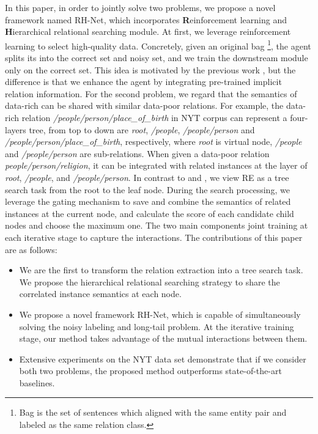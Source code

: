 \documentclass{article}
\begin{document}
In this paper, in order to jointly solve two problems, we propose a novel framework named RH-Net, which incorporates \textbf{R}einforcement learning and \textbf{H}ierarchical relational searching module. At first, we leverage reinforcement learning to select high-quality data. Concretely, given an original bag \footnote{Bag is the set of sentences which aligned with the same entity pair and labeled as the same relation class.}, the agent splits its into the correct set and noisy set, and we train the downstream module only on the correct set. This idea is motivated by the previous work \cite{Feng2018Reinforcement}, but the difference is that we enhance the agent by integrating pre-trained implicit relation information. For the second problem, we regard that the semantics of data-rich can be shared with similar data-poor relations. For example, the data-rich relation  \emph{/people/person/place\_of\_birth} in NYT corpus can represent a four-layers tree, from top to down are \emph{root}, \emph{/people}, \emph{/people/person} and \emph{/people/person/place\_of\_birth}, respectively, where \emph{root} is virtual node, \emph{/people} and \emph{/people/person} are sub-relations. When given a data-poor relation \emph{people/person/religion}, it can be integrated with related instances at the layer of \emph{root}, \emph{/people}, and \emph{/people/person}. In contrast to \cite{han2018hierarchical} and \cite{zhang2019long-tail}, we view RE as a tree search task from the root to the leaf node. During the search processing, we leverage the gating mechanism to save and combine the semantics of related instances at the current node, and calculate the score of each candidate child nodes and choose the maximum one. The two main components joint training at each iterative stage to capture the interactions. The contributions of this paper are as follows:
\begin{itemize}
    \item We are the first to transform the relation extraction into a tree search task. We propose the hierarchical relational searching strategy to share the correlated instance semantics at each node.
    
    \item We propose a novel framework RH-Net, which is capable of simultaneously solving the noisy labeling and long-tail problem. At the iterative training stage, our method takes advantage of the mutual interactions between them.
    
    \item Extensive experiments on the NYT data set demonstrate that if we consider both two problems, the proposed method outperforms state-of-the-art baselines.
\end{itemize}
\end{document}
